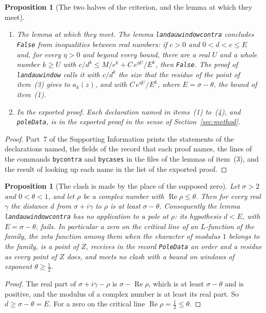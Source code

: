 \documentclass[11pt]{article}
\newtheorem{proposition}[theorem]{Proposition}
\theoremstyle{definition}
\theoremstyle{remark}
\newcommand{\re}{\operatorname{Re}}
\DeclareRobustCommand{\lean}[1]{{\renewcommand{\_}{\textunderscore\allowbreak}\texttt{#1}}}
\newcommand{\False}{\lean{False}}
\begin{document}
\begin{proposition}[The two halves of the criterion, and the lemma at which they meet]
\begin{enumerate}[leftmargin=2em,itemsep=1pt]
\item \emph{The lemma at which they meet.} The lemma \lean{landau\_window\_contra} concludes \False{} from inequalities between real numbers: if $c>0$ and $0<d<e\le E$ and, for every $\eta>0$ and beyond every bound, there are a real $U$ and a whole number $k\ge U$ with $c/d^{k}\le M/e^{k}+C\,e^{\eta U}/E^{k}$, then \False. The proof of \lean{landau\_window} calls it with $c/d^{k}$ the size that the residue of the point of item~(3) gives to $a_k(z)$, and with $C\,e^{\eta U}/E^{k}$, where $E=\sigma-\theta$, the bound of item~(1).
\item \emph{In the exported proof.} Each declaration named in items~(1) to~(4), and \lean{poleData}, is in the exported proof in the sense of Section~\ref{sec:method}.
\end{enumerate}
\end{proposition}

\begin{proof}
Part~7 of the Supporting Information prints the statements of the declarations named, the fields of the record that each proof names, the lines of the commands \lean{by\_contra} and \lean{by\_cases} in the files of the lemmas of item~(3), and the result of looking up each name in the list of the exported proof.
\end{proof}

\begin{proposition}[The clash is made by the place of the supposed zero]\label{prop:online}
Let $\sigma>2$ and $0<\theta<1$, and let $\rho$ be a complex number with $\re\rho\le\theta$. Then for every real $\gamma$ the distance $d$ from $\sigma+i\gamma$ to $\rho$ is at least $\sigma-\theta$. Consequently the lemma \lean{landau\_window\_contra} has no application to a pole at $\rho$: its hypothesis $d<E$, with $E=\sigma-\theta$, fails. In particular a zero on the critical line of an $L$-function of the family, the zeta function among them when the character of modulus $1$ belongs to the family, is a point of $Z$, receives in the record \lean{PoleData} an order and a residue as every point of $Z$ does, and meets no clash with a bound on windows of exponent $\theta\ge\tfrac12$.
\end{proposition}

\begin{proof}
The real part of $\sigma+i\gamma-\rho$ is $\sigma-\re\rho$, which is at least $\sigma-\theta$ and is positive, and the modulus of a complex number is at least its real part. So $d\ge\sigma-\theta=E$. For a zero on the critical line $\re\rho=\tfrac12\le\theta$.
\end{proof}
\end{document}

